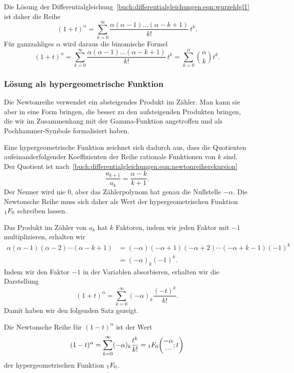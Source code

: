Die Lösung der 
Differentialgleichung~\eqref{buch:differentialgleichungen:eqn:wurzeldgl1}
ist daher die Reihe
\begin{equation}
(1+t)^\alpha
=
\sum_{k=0}^\infty
\frac{\alpha(\alpha-1)\dots(\alpha-k+1)}{k!}\, t^k.
\label{buch:differentialgleichungen:eqn:newtonreihe}
\end{equation}
Für ganzzahliges $\alpha$ wird daraus die binomische Formel
\[
(1+t)^\alpha
=
\sum_{k=0}^\infty
\frac{\alpha(\alpha-1)\dots(\alpha-k+1)}{k!}\, t^k
=
\sum_{k=0}^\alpha \binom{\alpha}{k} t^k.
\]

%
%
\subsubsection{Lösung als hypergeometrische Funktion}
Die Newtonreihe verwendet ein absteigendes Produkt im Zähler.
Man kann sie aber in eine Form bringen, die besser zu den aufsteigenden
Produkten bringen, die wir im Zusammenhang mit der Gamma-Funktion
angetroffen und als Pochhammer-Symbole formalisiert haben.

Eine hypergeometrische Funktion zeichnet sich dadurch aus, dass
die Quotienten aufeinanderfolgender Koeffizienten der Reihe rationale
Funktionen von $k$ sind.
Der Quotient ist
nach~\eqref{buch:differentialgleichungen:eqn:newtonreiherekursion}
\[
\frac{a_{k+1}}{a_k}
=
\frac{\alpha-k}{k+1}.
\]
Der Nenner wird nie $0$, aber das Zählerpolynom hat genau die Nullstelle
$-\alpha$.
Die Newtonsche Reihe muss sich daher als Wert der hypergeometrischen
Funktion $\mathstrut_1F_0$ schreiben lassen.
%

Das Produkt im Zähler von $a_k$ hat $k$ Faktoren, indem wir jeden Faktor
mit $-1$ multiplizieren, erhalten wir
\begin{align*}
\alpha(\alpha-1)(\alpha-2)\cdots(\alpha-k+1)
&=
(-\alpha)(-\alpha+1)(-\alpha+2)\cdots(-\alpha+k-1) (-1)^k
\\
&=
(-\alpha)_k (-1)^k.
\end{align*}
Indem wir den Faktor $-1$ in der Variablen absorbieren, erhalten
wir die Darstellung
\[
(1+t)^\alpha
=
\sum_{k=0}^\infty
(-\alpha)_k\frac{(-t)^k}{k!}.
\]
Damit haben wir den folgenden Satz gezeigt.

\begin{satz}
%
\label{buch:differentialgleichungen:satz:newtonschereihe}
Die Newtonsche Reihe für $(1-t)^\alpha$ ist der Wert
\[
(1-t)^\alpha
=
\sum_{k=0}^\infty (-\alpha)_k \frac{t^k}{k!}
=
\mathstrut_1F_0\biggl(\begin{matrix}-\alpha\\\text{---}\end{matrix};t\biggr)
\]
der hypergeometrischen Funktion $\mathstrut_1F_0$.
\end{satz}

